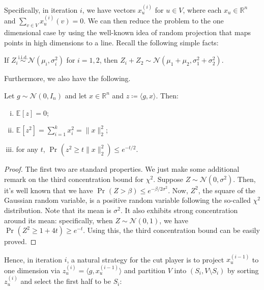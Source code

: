 Specifically, in iteration \(i\), we have vectors \(x^{(i)}_u\) for \(u \in V\), where each \(x_u \in \mathbb{R} ^n\) and \(\sum_{v \in V} x_u^{(i)}(v) = 0\). We can then reduce the problem to the one dimensional case by using the well-known idea of random projection that maps points in high dimensions to a line. Recall the following simple facts:

\begin{prev}
	If \(Z_i \overset{\text{i.i.d.} }{\sim } \mathcal{N} (\mu _i, \sigma _i^2)\) for \(i = 1, 2\), then \(Z_i + Z_2 \sim \mathcal{N} (\mu _1 + \mu _2, \sigma _1^2 + \sigma _2^2)\).
\end{prev}

Furthermore, we also have the following.

\begin{lemma}\label{lma:Gaussian-random-projection}
	Let \(g \sim \mathcal{N} (0, I_n)\) and let \(x \in \mathbb{R} ^n\) and \(z \coloneqq \langle g, x \rangle \). Then:
	\begin{enumerate}[(i)]
		\item \(\mathbb{E}_{}[z] = 0\);
		\item \(\mathbb{E}_{}[z^2] = \sum_{i=1}^{k} x_i^2 = \lVert x \rVert _2^2\);
		\item for any \(t\), \(\Pr_{}(z^2 \geq t \lVert x \rVert _2^2) \leq e^{-t / 2}\).
	\end{enumerate}
\end{lemma}
\begin{proof}
	The first two are standard properties. We just make some additional remark on the third concentration bound for \(\chi ^2\). Suppose \(Z \sim \mathcal{N} (0, \sigma ^2)\). Then, it's well known that we have \(\Pr_{}(Z > \beta ) \leq e^{- \beta / 2 \sigma ^2}\). Now, \(Z^2\), the square of the Gaussian random variable, is a positive random variable following the so-called \(\chi ^2\) distribution. Note that its mean is \(\sigma ^2\). It also exhibits strong concentration around its mean: specifically, when \(Z \sim \mathcal{N} (0, 1)\), we have \(\Pr_{}(Z^2 \geq 1 + 4t) \geq e^{-t}\). Using this, the third concentration bound can be easily proved.
\end{proof}

Hence, in iteration \(i\), a natural strategy for the cut player is to project \(x_u^{(i-1)}\) to one dimension via \(z_u^{(i)} = \langle g, x_u^{(i-1)} \rangle \) and partition \(V\) into \((S_i, V\setminus S_i)\) by sorting \(z_u^{(i)}\) and select the first half to be \(S_i\):

